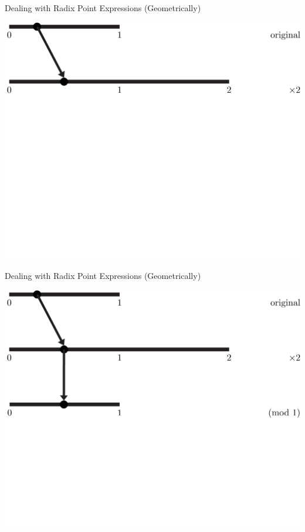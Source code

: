\documentclass{beamer}
\begin{document}
\begin{frame}{Dealing with Radix Point Expressions (Geometrically)}
  \begin{example}
    \includegraphics[width=\textwidth,height=0.75\textheight]{images/Binary/2}
  \end{example}
\end{frame}

\begin{frame}{Dealing with Radix Point Expressions (Geometrically)}
  \begin{example}
    \includegraphics[width=\textwidth,height=0.75\textheight]{images/Binary/3}
  \end{example}
\end{frame}
\end{document}
